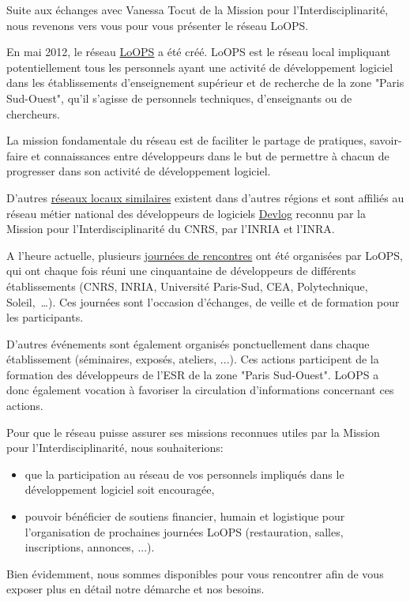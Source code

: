 Suite aux échanges avec Vanessa Tocut de la Mission pour
l'Interdisciplinarité, nous revenons vers vous pour vous
présenter le réseau LoOPS.

En mai 2012, le réseau \href{https://reseau-loops.github.io/}{LoOPS}
a été créé. LoOPS est le réseau local
impliquant potentiellement tous les personnels ayant une activité de
développement logiciel dans les établissements d'enseignement supérieur
et de recherche de la zone "Paris Sud-Ouest", qu'il s'agisse de personnels
techniques, d'enseignants ou de chercheurs.

La mission fondamentale du réseau est de faciliter le partage de pratiques,
savoir-faire et connaissances entre développeurs dans le but de permettre à
chacun de progresser dans son activité de développement logiciel.

D'autres \href{http://devlog.cnrs.fr/region}{réseaux locaux similaires} existent dans d'autres régions
et sont affiliés au réseau métier national des développeurs de logiciels
\href{http://devlog.cnrs.fr}{Devlog} reconnu par la Mission pour l'Interdisciplinarité
du CNRS, par l'INRIA et l'INRA.

A l'heure actuelle, plusieurs \href{https://reseau-loops.github.io/events.html}{journées de rencontres}
ont été organisées par LoOPS, qui ont chaque fois réuni une cinquantaine de développeurs de
différents établissements (CNRS, INRIA, Université Paris-Sud, CEA,
Polytechnique, Soleil,~\dots).
Ces journées sont l'occasion d'échanges, de veille et de
formation pour les participants.

D'autres événements sont également organisés ponctuellement dans chaque
établissement (séminaires, exposés, ateliers, ...). Ces actions participent
de la formation des développeurs de l'ESR de la zone "Paris Sud-Ouest". LoOPS
a donc également vocation à favoriser la circulation d'informations concernant
ces actions.

Pour que le réseau puisse assurer ses missions reconnues utiles par la Mission pour
l'Interdisciplinarité, nous souhaiterions:
\begin{itemize}
\item que la participation au réseau de vos personnels impliqués dans le
  développement logiciel soit encouragée,
\item pouvoir bénéficier de soutiens financier, humain et logistique pour
  l'organisation de prochaines journées LoOPS (restauration, salles,
  inscriptions, annonces, ...).
\end{itemize}

Bien évidemment, nous sommes disponibles pour vous rencontrer afin de vous
exposer plus en détail notre démarche et nos besoins.